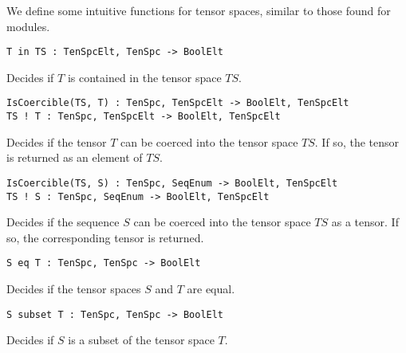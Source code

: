We define some intuitive functions for tensor spaces, similar to those found for modules.

\color{blue}
{\small \begin{verbatim}
T in TS : TenSpcElt, TenSpc -> BoolElt
\end{verbatim} }
\color{black}

Decides if $T$ is contained in the tensor space $TS$.

\color{blue}
{\small \begin{verbatim}
IsCoercible(TS, T) : TenSpc, TenSpcElt -> BoolElt, TenSpcElt
TS ! T : TenSpc, TenSpcElt -> BoolElt, TenSpcElt
\end{verbatim} }
\color{black}

Decides if the tensor $T$ can be coerced into the tensor space $TS$. If so, the tensor is returned as an element of $TS$.

\color{blue}
{\small \begin{verbatim}
IsCoercible(TS, S) : TenSpc, SeqEnum -> BoolElt, TenSpcElt
TS ! S : TenSpc, SeqEnum -> BoolElt, TenSpcElt
\end{verbatim} }
\color{black}

Decides if the sequence $S$ can be coerced into the tensor space $TS$ as a tensor. If so, the corresponding tensor is returned. 

\color{blue}
{\small \begin{verbatim}
S eq T : TenSpc, TenSpc -> BoolElt
\end{verbatim} }
\color{black}

Decides if the tensor spaces $S$ and $T$ are equal.

\color{blue}
{\small \begin{verbatim}
S subset T : TenSpc, TenSpc -> BoolElt
\end{verbatim} }
\color{black}

Decides if $S$ is a subset of the tensor space $T$.

